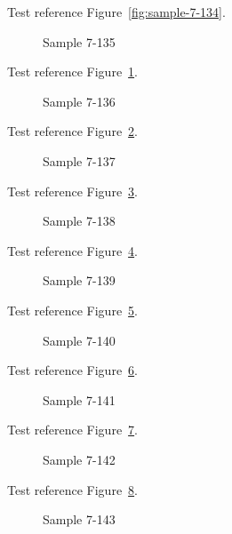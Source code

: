 Test reference Figure~\ref{fig:sample-7-134}.

\begin{figure}[tbhp]
\caption{Sample 7-135}
\label{fig:sample-7-135}
\end{figure}

Test reference Figure~\ref{fig:sample-7-135}.

\begin{figure}[tbhp]
\caption{Sample 7-136}
\label{fig:sample-7-136}
\end{figure}

Test reference Figure~\ref{fig:sample-7-136}.

\begin{figure}[tbhp]
\caption{Sample 7-137}
\label{fig:sample-7-137}
\end{figure}

Test reference Figure~\ref{fig:sample-7-137}.

\begin{figure}[tbhp]
\caption{Sample 7-138}
\label{fig:sample-7-138}
\end{figure}

Test reference Figure~\ref{fig:sample-7-138}.

\begin{figure}[tbhp]
\caption{Sample 7-139}
\label{fig:sample-7-139}
\end{figure}

Test reference Figure~\ref{fig:sample-7-139}.

\begin{figure}[tbhp]
\caption{Sample 7-140}
\label{fig:sample-7-140}
\end{figure}

Test reference Figure~\ref{fig:sample-7-140}.

\begin{figure}[tbhp]
\caption{Sample 7-141}
\label{fig:sample-7-141}
\end{figure}

Test reference Figure~\ref{fig:sample-7-141}.

\begin{figure}[tbhp]
\caption{Sample 7-142}
\label{fig:sample-7-142}
\end{figure}

Test reference Figure~\ref{fig:sample-7-142}.

\begin{figure}[tbhp]
\caption{Sample 7-143}
\label{fig:sample-7-143}
\end{figure}

